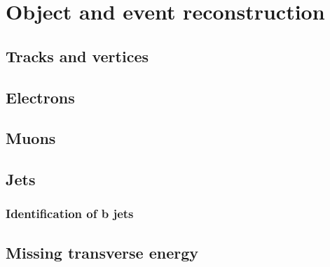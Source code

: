 \chapter{Object and event reconstruction}
\label{ch:EventReconstruction}

\section{Tracks and vertices}
\section{Electrons}
\section{Muons}
\section{Jets}
\subsection{Identification of b jets}
\section{Missing transverse energy}